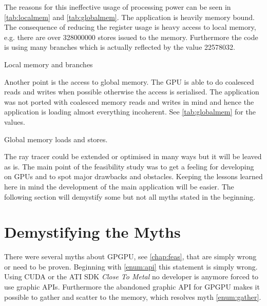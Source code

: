 The reasons for this ineffective usage of processing power can be seen in
\autoref{tab:localmem} and \autoref{tab:globalmem}. The application is heavily
memory bound. The consequence of reducing the register usage is heavy access to
local memory, e.g. there are over 328000000 stores issued to the memory.
Furthermore the code is using many branches which is actually reflected by the
value 22578032.


\begin{table}[ht]
	\centering
	\qquad
	
	\caption{Local memory and branches}
\end{table}

Another point is the access to global memory. The \gls{GPU} is able to do
coalesced reads and writes when possible otherwise the access is serialised. The
application was not ported with coalesced memory reads and writes in mind and
hence the application is loading almost everything incoherent. See
\autoref{tab:globalmem} for the values.

\begin{table}[ht]
    \centering
  	\caption[Global memory loads and stores]{Global memory loads and stores.}
  	\label{tab:globalmem}
\end{table}

The ray tracer could be extended or optimised in many ways but it will be leaved
as is. The main point of the feasibility study was to get a feeling for
developing on \glspl{GPU} and to spot major drawbacks and obstacles. Keeping the
lessons learned here in mind the development of the main application will be
easier. The following section will demystify some but not all myths stated in
the beginning.

\section{Demystifying the Myths} %
\label{sec:demystifing_the_myths}
There were several myths about \gls{GPGPU}, see \autoref{chap:feas}, that are
simply wrong or need to be proven. Beginning with \autoref{enum:api} this
statement is simply wrong. Using \gls{CUDA} or the \gls{ATI} \gls{SDK} \emph{Close To
Metal} no developer is anymore forced to use graphic \glspl{API}. Furthermore
the abandoned graphic \gls{API} for \gls{GPGPU} makes it possible to gather
and scatter to the memory, which resolves myth \autoref{enum:gather}.

